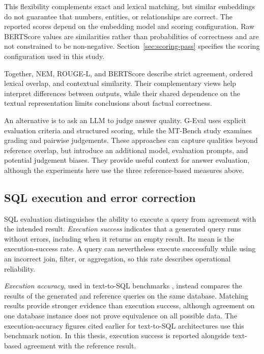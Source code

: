 This flexibility complements exact and lexical matching, but similar embeddings do not guarantee that
numbers, entities, or relationships are correct. The reported scores depend on the embedding model and
scoring configuration. Raw BERTScore values are similarities rather than probabilities of correctness and are
not constrained to be non-negative. Section~\ref{sec:scoring-pass} specifies the scoring configuration used in
this study.

Together, NEM, ROUGE-L, and BERTScore describe strict agreement, ordered lexical overlap, and contextual
similarity. Their complementary views help interpret differences between outputs, while their shared
dependence on the textual representation limits conclusions about factual correctness.

An alternative is to ask an LLM to judge answer quality. G-Eval \cite{liu2023g} uses explicit evaluation
criteria and structured scoring, while the MT-Bench study \cite{zheng2023judging} examines grading and
pairwise judgements. These approaches can capture qualities beyond reference overlap, but introduce an
additional model, evaluation prompts, and potential judgement biases. They provide useful context for answer
evaluation, although the experiments here use the three reference-based measures above.

\subsection{SQL execution and error correction} \label{sec:sql-execution-metrics}

SQL evaluation distinguishes the ability to execute a query from agreement with the intended result.
\emph{Execution success} indicates that a generated query runs without errors, including when it returns an
empty result. Its mean is the execution-success rate. A query can nevertheless execute successfully while
using an incorrect join, filter, or aggregation, so this rate describes operational reliability.

\emph{Execution accuracy}, used in text-to-SQL benchmarks \cite{yu2018spider,li2023can}, instead compares the
results of the generated and reference queries on the same database. Matching results provide stronger
evidence than execution success, although agreement on one database instance does not prove equivalence on
all possible data. The execution-accuracy figures cited earlier for text-to-SQL architectures use this
benchmark notion. In this thesis, execution success is reported alongside text-based agreement with the
reference result.

